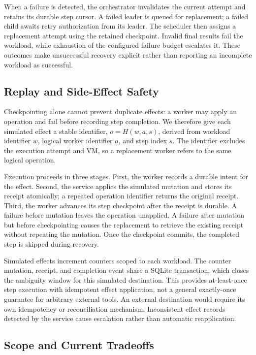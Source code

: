When a failure is detected, the orchestrator invalidates the current attempt
and retains its durable step cursor. A failed leader is queued for replacement;
a failed child awaits retry authorization from its leader. The scheduler then
assigns a replacement attempt using the retained checkpoint. Invalid final
results fail the workload, while exhaustion of the configured failure budget
escalates it. These outcomes make unsuccessful recovery explicit rather than
reporting an incomplete workload as successful.

\subsection{Replay and Side-Effect Safety}
\label{sec:effects}

Checkpointing alone cannot prevent duplicate effects: a worker may apply an
operation and fail before recording step completion. We therefore give each
simulated effect a stable identifier,
$o = H(w, a, s)$, derived from workload identifier $w$, logical worker identifier
$a$, and step index $s$. The identifier excludes the execution attempt and VM,
so a replacement worker refers to the same logical operation.

Execution proceeds in three stages. First, the worker records a durable intent
for the effect. Second, the service applies the simulated mutation and stores
its receipt atomically; a repeated operation identifier returns the original
receipt. Third, the worker advances its step checkpoint after the receipt is
durable. A failure before mutation leaves the operation unapplied. A failure
after mutation but before checkpointing causes the replacement to retrieve the
existing receipt without repeating the mutation. Once the checkpoint commits,
the completed step is skipped during recovery.

Simulated effects increment counters scoped to each workload. The
counter mutation, receipt, and completion event share a SQLite transaction,
which closes the ambiguity window for this simulated destination. This provides
at-least-once step execution with idempotent effect application, not a general
exactly-once guarantee for arbitrary external tools. An external destination
would require its own idempotency or reconciliation mechanism. Inconsistent
effect records detected by the service cause escalation rather than automatic
reapplication.

\subsection{Scope and Current Tradeoffs}
\label{sec:architecture-scope}

